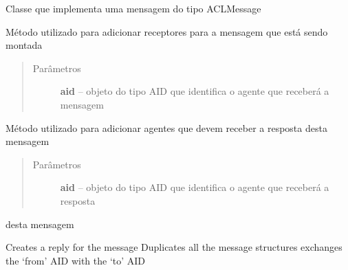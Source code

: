 \documentclass[letterpaper,10pt,brazil]{sphinxmanual}
\begin{document}
\begin{fulllineitems}
\label{api:pade.acl.messages.ACLMessage}
Classe que implementa uma mensagem do tipo ACLMessage

\begin{fulllineitems}
\label{api:pade.acl.messages.ACLMessage.add_receiver}
Método utilizado para adicionar receptores para a mensagem que está
sendo montada
\begin{quote}\begin{description}
\item[{Parâmetros}] \leavevmode
\textbf{aid} -- objeto do tipo AID que identifica o agente que receberá a mensagem

\end{description}\end{quote}

\end{fulllineitems}


\begin{fulllineitems}
\label{api:pade.acl.messages.ACLMessage.add_reply_to}
Método utilizado para adicionar agentes que devem receber
a resposta desta mensagem
\begin{quote}\begin{description}
\item[{Parâmetros}] \leavevmode
\textbf{aid} -- objeto do tipo AID que identifica o agente que receberá a resposta

\end{description}\end{quote}

desta mensagem

\end{fulllineitems}


\begin{fulllineitems}
\label{api:pade.acl.messages.ACLMessage.create_reply}
Creates a reply for the message
Duplicates all the message structures
exchanges the `from' AID with the `to' AID


\end{fulllineitems}
\end{fulllineitems}
\end{document}
